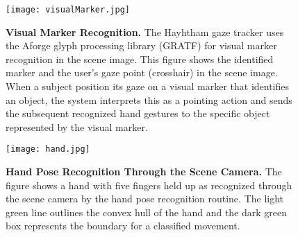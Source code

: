 \documentclass[jou,a4paper,notxfonts]{apa}
\begin{document}
\begin{figure}[tp]
 \texttt{[image: visualMarker.jpg]}
 \caption{\textbf{Visual Marker Recognition.} The Hayhtham gaze tracker uses the Aforge glyph processing library (GRATF) for visual marker recognition in the scene image. This figure shows the identified marker and the user's gaze point (crosshair) in the scene image. When a subject position  its gaze  on a visual marker that identifies an object, the system interprets this as a pointing action and sends the subsequent recognized hand gestures to the  specific object represented by the visual marker.}
 \label{visualMarker}
\end{figure}

\begin{figure}[tp]
 \texttt{[image: hand.jpg]}
 \caption{\textbf{Hand Pose Recognition Through the Scene Camera.} The figure shows a hand with five fingers held 
 up as recognized through the scene camera by the hand pose recognition routine. The light green line outlines the convex hull of the hand and the dark green box represents the boundary for a classified movement.}
 \label{hand}
\end{figure}
\end{document}
